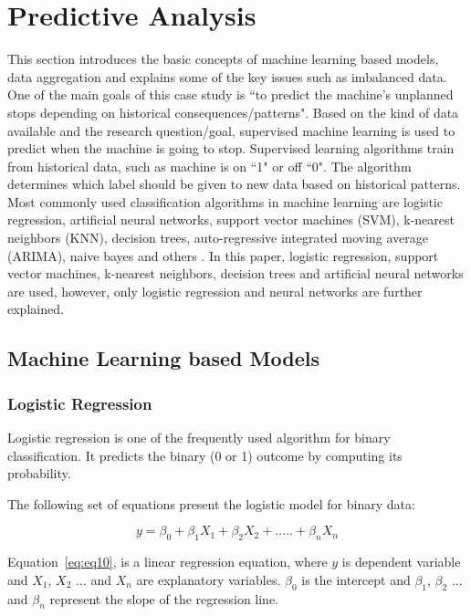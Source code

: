 \documentclass[runningheads]{llncs}
\begin{document}
 

\section {Predictive Analysis}
\label{sec:modeling}
This section introduces the basic concepts of machine learning based models, data aggregation and explains some of the key issues such as imbalanced data. One of the main goals of this case study is ``to predict the machine's unplanned stops depending on historical consequences/patterns". Based on the kind of data available and the research question/goal, supervised machine learning is used to predict when the machine is going to stop. Supervised learning algorithms train from historical data, such as machine is on ``1" or off ``0".  The algorithm determines which label should be given to new data based on historical patterns. Most commonly used classification algorithms in machine learning are logistic regression, artificial neural networks, support vector machines (SVM), k-nearest neighbors (KNN), decision trees, auto-regressive integrated moving average (ARIMA), naive bayes and others \cite{gooijer}. In this paper, logistic regression, support vector machines, k-nearest neighbors, decision trees and artificial neural networks are used, however, only logistic regression and neural networks are further explained.


\subsection {Machine Learning based Models}

\subsubsection {Logistic Regression}
\label{sec:LR}
Logistic regression is one of the frequently used algorithm for binary classification. It predicts the binary (0 or 1) outcome by computing its probability.

The following set of equations present the logistic model for binary data:

\begin{equation}
\label{eq:eq10}
y = \beta_0 + \beta_1 X_1 + \beta_2 X_2 + ..... + \beta_n X_n
\end{equation}

Equation~\ref{eq:eq10}, is a linear regression equation, where $y$ is dependent variable and $X_1$, $X_2$ $...$ and $X_n$ are explanatory variables. $\beta_0$ is the intercept and  $\beta_1$, $\beta_2$  ... and  $\beta_n$ represent the slope of the regression line.
\end{document}
